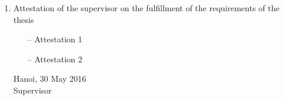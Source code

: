 \begin{requirement}
\begin{enumerate}[leftmargin=*]
	\item Attestation of the supervisor on the fulfillment of the requirements of the thesis
	\begin{itemize}
		\item[--] Attestation 1
		\item[--] Attestation 2
	\end{itemize}
	\flushright
	\begin{minipage}{0.5\linewidth}
		\centering
		Hanoi, 30 May 2016\\
		Supervisor\\
		\vspace{30pt}
		\supervisor
	\end{minipage}	
\end{enumerate}
\end{requirement}